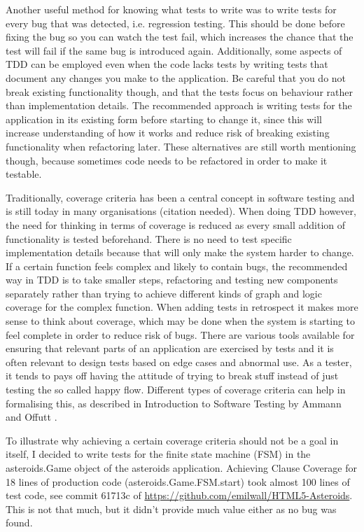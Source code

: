 \documentclass[11pt]{article}
\begin{document}
Another useful method for knowing what tests to write was to write tests for every bug that was detected, i.e. regression testing. This should be done before fixing the bug so you can watch the test fail, which increases the chance that the test will fail if the same bug is introduced again. Additionally, some aspects of TDD can be employed even when the code lacks tests by writing tests that document any changes you make to the application. Be careful that you do not break existing functionality though, and that the tests focus on behaviour rather than implementation details. The recommended approach is writing tests for the application in its existing form before starting to change it, since this will increase understanding of how it works and reduce risk of breaking existing functionality when refactoring later. These alternatives are still worth mentioning though, because sometimes code needs to be refactored in order to make it testable.

Traditionally, coverage criteria has been a central concept in software testing and is still today in many organisations (citation needed). When doing TDD however, the need for thinking in terms of coverage is reduced as every small addition of functionality is tested beforehand. There is no need to test specific implementation details because that will only make the system harder to change. If a certain function feels complex and likely to contain bugs, the recommended way in TDD is to take smaller steps, refactoring and testing new components separately rather than trying to achieve different kinds of graph and logic coverage for the complex function. When adding tests in retrospect it makes more sense to think about coverage, which may be done when the system is starting to feel complete in order to reduce risk of bugs. There are various tools available for ensuring that relevant parts of an application are exercised by tests and it is often relevant to design tests based on edge cases and abnormal use. As a tester, it tends to pays off having the attitude of trying to break stuff instead of just testing the so called happy flow. Different types of coverage criteria can help in formalising this, as described in Introduction to Software Testing by Ammann and Offutt \cite{AmmannOffutt}.

To illustrate why achieving a certain coverage criteria should not be a goal in itself, I decided to write tests for the finite state machine (FSM) in the asteroids.Game object of the asteroids application. Achieving Clause Coverage\cite[p.~106]{AmmannOffutt} for 18 lines of production code (asteroids.Game.FSM.start) took almost 100 lines of test code, see commit 61713c of \url{https://github.com/emilwall/HTML5-Asteroids}. This is not that much, but it didn't provide much value either as no bug was found.
\end{document}

